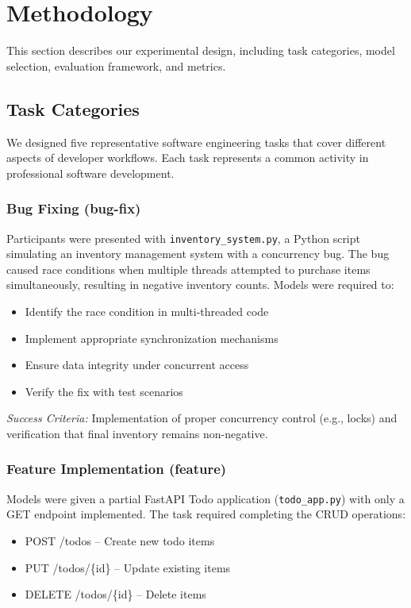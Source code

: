 \section{Methodology}
\label{sec:methodology}

This section describes our experimental design, including task categories, model selection, evaluation framework, and metrics.

\subsection{Task Categories}
\label{sec:tasks}

We designed five representative software engineering tasks that cover different aspects of developer workflows. Each task represents a common activity in professional software development.

\subsubsection{Bug Fixing (bug-fix)}
Participants were presented with \texttt{inventory\_system.py}, a Python script simulating an inventory management system with a concurrency bug. The bug caused race conditions when multiple threads attempted to purchase items simultaneously, resulting in negative inventory counts. Models were required to:
\begin{itemize}
    \item Identify the race condition in multi-threaded code
    \item Implement appropriate synchronization mechanisms
    \item Ensure data integrity under concurrent access
    \item Verify the fix with test scenarios
\end{itemize}

\textit{Success Criteria:} Implementation of proper concurrency control (e.g., locks) and verification that final inventory remains non-negative.

\subsubsection{Feature Implementation (feature)}
Models were given a partial FastAPI Todo application (\texttt{todo\_app.py}) with only a GET endpoint implemented. The task required completing the CRUD operations:
\begin{itemize}
    \item POST /todos -- Create new todo items
    \item PUT /todos/\{id\} -- Update existing items
    \item DELETE /todos/\{id\} -- Delete items
\end{itemize}

